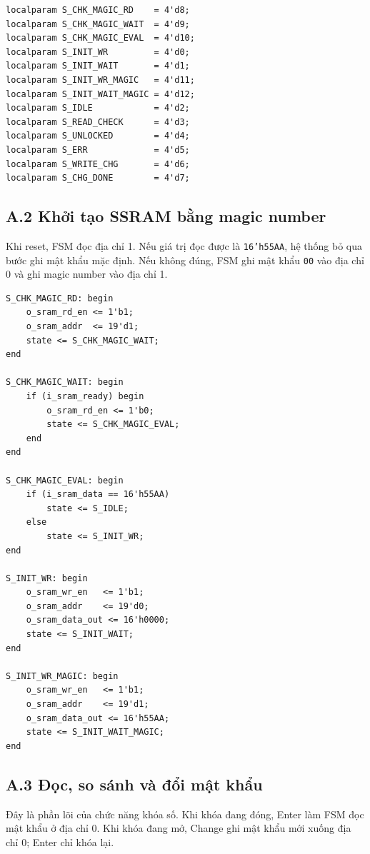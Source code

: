 \documentclass[13pt,a4paper]{article}
\begin{document}
\begin{lstlisting}[style=verilogstyle]
localparam S_CHK_MAGIC_RD    = 4'd8;
localparam S_CHK_MAGIC_WAIT  = 4'd9;
localparam S_CHK_MAGIC_EVAL  = 4'd10;
localparam S_INIT_WR         = 4'd0;
localparam S_INIT_WAIT       = 4'd1;
localparam S_INIT_WR_MAGIC   = 4'd11;
localparam S_INIT_WAIT_MAGIC = 4'd12;
localparam S_IDLE            = 4'd2;
localparam S_READ_CHECK      = 4'd3;
localparam S_UNLOCKED        = 4'd4;
localparam S_ERR             = 4'd5;
localparam S_WRITE_CHG       = 4'd6;
localparam S_CHG_DONE        = 4'd7;
\end{lstlisting}

\subsection*{A.2 Khởi tạo SSRAM bằng magic number}
Khi reset, FSM đọc địa chỉ 1. Nếu giá trị đọc được là \texttt{16'h55AA}, hệ thống bỏ qua bước ghi mật khẩu mặc định. Nếu không đúng, FSM ghi mật khẩu \texttt{00} vào địa chỉ 0 và ghi magic number vào địa chỉ 1.

\begin{lstlisting}[style=verilogstyle]
S_CHK_MAGIC_RD: begin
    o_sram_rd_en <= 1'b1;
    o_sram_addr  <= 19'd1;
    state <= S_CHK_MAGIC_WAIT;
end

S_CHK_MAGIC_WAIT: begin
    if (i_sram_ready) begin
        o_sram_rd_en <= 1'b0;
        state <= S_CHK_MAGIC_EVAL;
    end
end

S_CHK_MAGIC_EVAL: begin
    if (i_sram_data == 16'h55AA)
        state <= S_IDLE;
    else
        state <= S_INIT_WR;
end

S_INIT_WR: begin
    o_sram_wr_en   <= 1'b1;
    o_sram_addr    <= 19'd0;
    o_sram_data_out <= 16'h0000;
    state <= S_INIT_WAIT;
end

S_INIT_WR_MAGIC: begin
    o_sram_wr_en   <= 1'b1;
    o_sram_addr    <= 19'd1;
    o_sram_data_out <= 16'h55AA;
    state <= S_INIT_WAIT_MAGIC;
end
\end{lstlisting}

\subsection*{A.3 Đọc, so sánh và đổi mật khẩu}
Đây là phần lõi của chức năng khóa số. Khi khóa đang đóng, Enter làm FSM đọc mật khẩu ở địa chỉ 0. Khi khóa đang mở, Change ghi mật khẩu mới xuống địa chỉ 0; Enter chỉ khóa lại.
\end{document}
